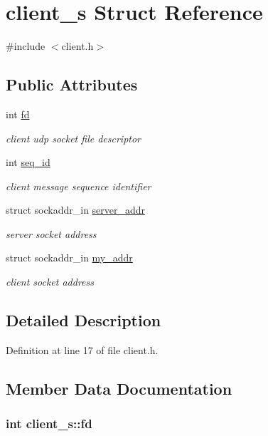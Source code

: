 \hypertarget{structclient__s}{\section{client\-\_\-s Struct Reference}
\label{structclient__s}
}


{\ttfamily \#include $<$client.\-h$>$}

\subsection*{Public Attributes}
\begin{DoxyCompactItemize}
\item 
int \hyperlink{structclient__s_a9babf0c4dea4b555e6b87a47f4ca98cd}{fd}
\begin{DoxyCompactList}\small\item\em client udp socket file descriptor \end{DoxyCompactList}\item 
int \hyperlink{structclient__s_aa10e2d632839fa347fd9835f8a41a694}{seq\-\_\-id}
\begin{DoxyCompactList}\small\item\em client message sequence identifier \end{DoxyCompactList}\item 
struct sockaddr\-\_\-in \hyperlink{structclient__s_a4cb8f28435762b205424d16ea39dcab3}{server\-\_\-addr}
\begin{DoxyCompactList}\small\item\em server socket address \end{DoxyCompactList}\item 
struct sockaddr\-\_\-in \hyperlink{structclient__s_a618e45173f1bb6920a8c9afe885e16be}{my\-\_\-addr}
\begin{DoxyCompactList}\small\item\em client socket address \end{DoxyCompactList}\end{DoxyCompactItemize}


\subsection{Detailed Description}


Definition at line 17 of file client.\-h.



\subsection{Member Data Documentation}
\hypertarget{structclient__s_a9babf0c4dea4b555e6b87a47f4ca98cd}{
\subsubsection[{fd}]{\setlength{\rightskip}{0pt plus 5cm}int client\-\_\-s\-::fd}}\label{structclient__s_a9babf0c4dea4b555e6b87a47f4ca98cd}


